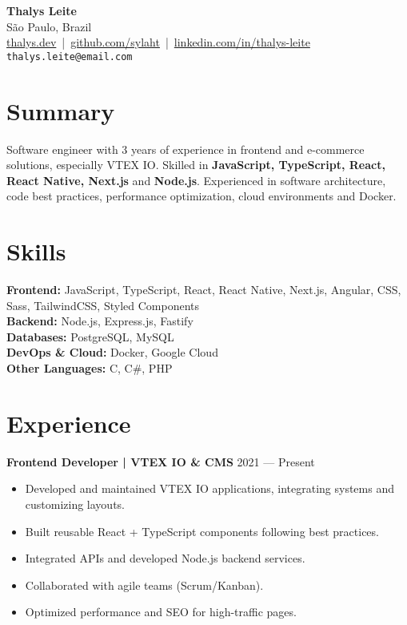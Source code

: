 \documentclass[a4paper,10pt]{article}
\begin{document}
\begin{center}
    {\LARGE \textbf{Thalys Leite}}\\[2mm]
    São Paulo, Brazil \\[1mm]
    \href{https://thalys.dev}{thalys.dev} \,|\, 
    \href{https://github.com/sylaht}{github.com/sylaht} \,|\, 
    \href{https://www.linkedin.com/in/thalys-leite-94a80a234/}{linkedin.com/in/thalys-leite}\\[2mm]
    \texttt{thalys.leite@email.com}
\end{center}

\vspace{0.3cm}

\section*{Summary}
Software engineer with 3 years of experience in frontend and e-commerce solutions, especially VTEX IO.
Skilled in \textbf{JavaScript, TypeScript, React, React Native, Next.js} and \textbf{Node.js}.
Experienced in software architecture, code best practices, performance optimization, cloud environments and Docker.

\section*{Skills}
\textbf{Frontend:} JavaScript, TypeScript, React, React Native, Next.js, Angular, CSS, Sass, TailwindCSS, Styled Components\\
\textbf{Backend:} Node.js, Express.js, Fastify\\
\textbf{Databases:} PostgreSQL, MySQL\\
\textbf{DevOps \& Cloud:} Docker, Google Cloud\\
\textbf{Other Languages:} C, C\#, PHP

\section*{Experience}
\textbf{Frontend Developer | VTEX IO \& CMS} \hfill 2021 — Present\\[-4pt]
\begin{itemize}[leftmargin=1.2em, noitemsep, topsep=3pt]
    \item Developed and maintained VTEX IO applications, integrating systems and customizing layouts.
    \item Built reusable React + TypeScript components following best practices.
    \item Integrated APIs and developed Node.js backend services.
    \item Collaborated with agile teams (Scrum/Kanban).
    \item Optimized performance and SEO for high-traffic pages.
\end{itemize}
\end{document}
